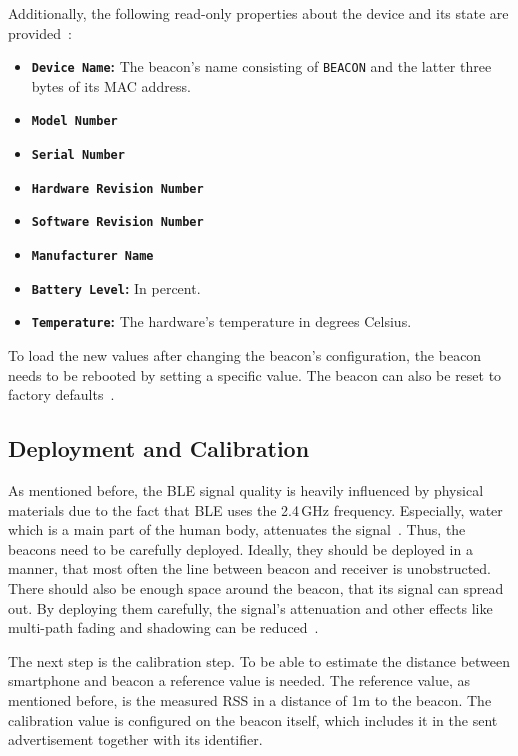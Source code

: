 \noindent Additionally, the following read-only properties about the device and its state are provided~\citep{binside:ds}:
\begin{itemize}
  \item \textbf{\texttt{Device Name}:} The beacon's name consisting of \texttt{BEACON} and the latter three bytes of its \acs{MAC} address.
  \item \textbf{\texttt{Model Number}}
  \item \textbf{\texttt{Serial Number}}
  \item \textbf{\texttt{Hardware Revision Number}}
  \item \textbf{\texttt{Software Revision Number}}
  \item \textbf{\texttt{Manufacturer Name}}
  \item \textbf{\texttt{Battery Level}:} In percent.
  \item \textbf{\texttt{Temperature}:} The hardware's temperature in degrees Celsius.
\end{itemize}

\noindent To load the new values after changing the beacon's configuration, the beacon needs to be rebooted by setting a specific value. The beacon can also be reset to factory defaults~\citep{binside:ds}.

\subsection{Deployment and Calibration}
As mentioned before, the \ac{BLE} signal quality is heavily influenced by physical materials due to the fact that \ac{BLE} uses the 2.4\,GHz frequency. Especially, water which is a main part of the human body, attenuates the signal~\citep{apple:getting_started}. Thus, the beacons need to be carefully deployed. Ideally, they should be deployed in a manner, that most often the line between beacon and receiver is unobstructed. There should also be enough space around the beacon, that its signal can spread out. By deploying them carefully, the signal's attenuation and other effects like multi-path fading and shadowing can be reduced~\citep{apple:getting_started,IEEE:survey_wireless_indoor_pos}.

The next step is the calibration step. To be able to estimate the distance between smartphone and beacon a reference value is needed. The reference value, as mentioned before, is the measured \ac{RSS} in a distance of 1m to the beacon. The calibration value is configured on the beacon itself, which includes it in the sent advertisement together with its identifier.

